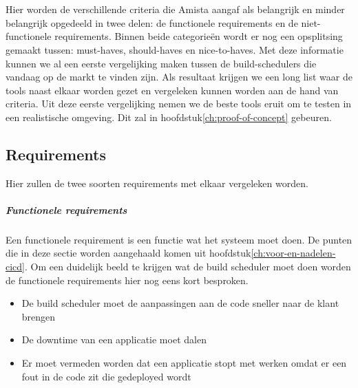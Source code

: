 

\chapter{}
\label{ch:vergelijking-build-schedulers}
Hier worden de verschillende criteria die Amista aangaf als belangrijk en minder belangrijk opgedeeld in twee delen: de functionele requirements en de niet-functionele requirements. Binnen beide categorieën wordt er nog een opsplitsing gemaakt tussen: must-haves, should-haves en nice-to-haves.
Met deze informatie kunnen we al een eerste vergelijking maken tussen de build-schedulers die vandaag op de markt te vinden zijn. Als resultaat krijgen we een long list waar de tools naast elkaar worden gezet en vergeleken kunnen worden aan de hand van criteria. 
Uit deze eerste vergelijking nemen we de beste tools eruit om te testen in een realistische omgeving. Dit zal in hoofdstuk\ref{ch:proof-of-concept} gebeuren.

\section{Requirements}
\label{sec:requirements}
Hier zullen de twee soorten requirements met elkaar vergeleken worden.

\paragraph{Functionele requirements}
Een functionele requirement is een functie wat het systeem moet doen.
De punten die in deze sectie worden aangehaald komen uit hoofdstuk\ref{ch:voor-en-nadelen-cicd}. Om een duidelijk beeld te krijgen wat de build scheduler moet doen worden de functionele requirements hier nog eens kort besproken.
\begin{itemize}
    \item De build scheduler moet de aanpassingen aan de code sneller naar de klant brengen
    \item De downtime van een applicatie moet dalen
    \item Er moet vermeden worden dat een applicatie stopt met werken omdat er een fout in de code zit die gedeployed wordt
\end{itemize}

